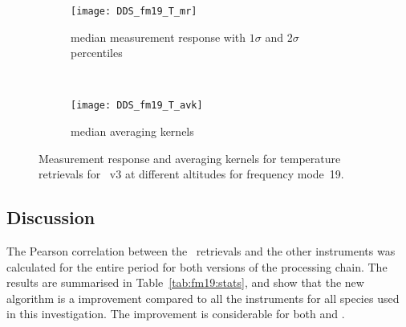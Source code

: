 \begin{figure}[tbhp]
    \centering
    \begin{subfigure}[b]{0.49\textwidth}
        \texttt{[image: DDS\_fm19\_T\_mr]}
        \caption{median measurement response with $1\sigma$ and $2\sigma$
        percentiles}
        \label{fig:fm19:T:mr}
    \end{subfigure}
    \,
    \begin{subfigure}[b]{0.49\textwidth}
        \texttt{[image: DDS\_fm19\_T\_avk]}
        \caption{median averaging kernels\newline~}
        \label{fig:fm19:T:avk}
    \end{subfigure}
    \caption{Measurement response and averaging kernels for temperature
    retrievals for \smr~v3 at different altitudes for frequency mode~19.}
    \label{fig:fm19:T:mr_avk}
\end{figure}


\subsection{Discussion}
\label{sec:fm19:discussion}
The Pearson correlation between the \smr\ retrievals and the other instruments
was calculated for the entire period for both versions of the processing chain.
The results are summarised in Table~\ref{tab:fm19:stats}, and show that the
new algorithm is a improvement compared to all the instruments for all species
used in this investigation. The improvement is considerable for both 
and .


